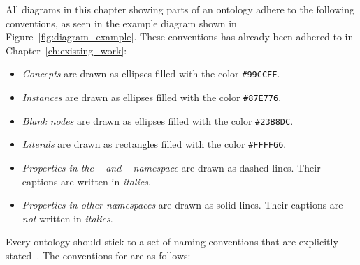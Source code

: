 All diagrams in this chapter showing parts of an ontology adhere to the following conventions, as seen in the example diagram shown in Figure~\ref{fig:diagram_example}. These conventions has already been adhered to in Chapter~\ref{ch:existing_work}:
\begin{itemize}
  \item \emph{Concepts} are drawn as ellipses filled with the color \texttt{\textcolor{convention_color1}{\#99CCFF}}.
  \item \emph{Instances} are drawn as ellipses filled with the color \texttt{\textcolor{convention_color2}{\#87E776}}.
  \item \emph{Blank nodes} are drawn as ellipses filled with the color \texttt{\textcolor{convention_color3}{\#23B8DC}}.
  \item \emph{Literals} are drawn as rectangles filled with the color \texttt{\colorbox{convention_color_bg4}{\textcolor{convention_color4}{\#FFFF66}}}.
  \item \emph{Properties in the ~\cite{RDF} and ~\cite{RDFS} namespace} are drawn as dashed lines. Their captions are written in \emph{italics}.
  \item \emph{Properties in other namespaces} are drawn as solid lines. Their captions are \emph{not} written in \emph{italics}.
\end{itemize}

Every ontology should stick to a set of naming conventions that are explicitly stated~\cite{Ontology101}. The conventions for \smarthomeweather are as follows:

